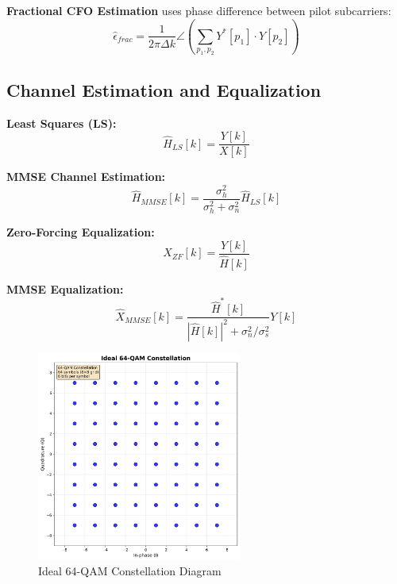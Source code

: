 \documentclass[11pt,a4paper]{article}
\begin{document}
\textbf{Fractional CFO Estimation} uses phase difference between pilot subcarriers:
\begin{equation}
\hat{\epsilon}_{frac} = \frac{1}{2\pi \Delta k} \angle\left( \sum_{p_1, p_2} Y^*[p_1] \cdot Y[p_2] \right)
\end{equation}

\subsection{Channel Estimation and Equalization}
\textbf{Least Squares (LS):}
\begin{equation}
\hat{H}_{LS}[k] = \frac{Y[k]}{X[k]}
\end{equation}

\textbf{MMSE Channel Estimation:}
\begin{equation}
\hat{H}_{MMSE}[k] = \frac{\sigma_h^2}{\sigma_h^2 + \sigma_n^2} \hat{H}_{LS}[k]
\end{equation}

\textbf{Zero-Forcing Equalization:}
\begin{equation}
\hat{X}_{ZF}[k] = \frac{Y[k]}{\hat{H}[k]}
\end{equation}

\textbf{MMSE Equalization:}
\begin{equation}
\hat{X}_{MMSE}[k] = \frac{\hat{H}^*[k]}{|\hat{H}[k]|^2 + \sigma_n^2/\sigma_s^2} Y[k]
\end{equation}

\begin{figure}[H]
    \centering
    \includegraphics[width=0.6\textwidth]{ideal_64qam_constellation.png}
    \caption{Ideal 64-QAM Constellation Diagram}
    \label{fig:ideal_constellation}
\end{figure}
\end{document}
